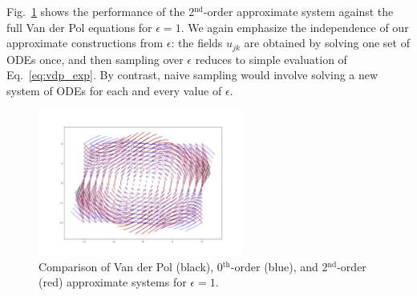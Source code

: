 \documentclass[11pt]{article}
\begin{document}
\noindent Fig.~\ref{fig:vdp_vs_approx} shows the performance of the 2$^{\text{nd}}$-order approximate system against the full Van der Pol equations for $\epsilon=1$.
We again emphasize the independence of our approximate constructions from $\epsilon$: the fields $u_{jk}$ are obtained by solving one set of ODEs once, and then sampling over $\epsilon$ reduces to simple evaluation of Eq.~\ref{eq:vdp_exp}.
By contrast, naive sampling would involve solving a new system of ODEs for each and every value of $\epsilon$.

\begin{figure}[h]
        \centering
        \includegraphics[width=0.6\textwidth]{vdp_vs_approx_eps1.png}
        \caption{Comparison of Van der Pol (black), 0$^{\text{th}}$-order (blue), and 2$^{\text{nd}}$-order (red) approximate systems for $\epsilon=1$.}
        \label{fig:vdp_vs_approx}
\end{figure}



\section*{}
\newpage


\end{document}
